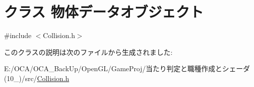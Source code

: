\hypertarget{class_xE7_x89_xA9_xE4_xBD_x93_xE3_x83_x87_xE3_x83_xBC_xE3_x82_xBF_xE3_x82_xAA_xE3_x83_x96_xE3_x8ec2332b82cff889ade5098f64c7880c4}{\section{クラス 物体データオブジェクト}
\label{class_xE7_x89_xA9_xE4_xBD_x93_xE3_x83_x87_xE3_x83_xBC_xE3_x82_xBF_xE3_x82_xAA_xE3_x83_x96_xE3_x8ec2332b82cff889ade5098f64c7880c4}
}


{\ttfamily \#include $<$Collision.\-h$>$}



このクラスの説明は次のファイルから生成されました\-:\begin{DoxyCompactItemize}
\item 
E\-:/\-O\-C\-A/\-O\-C\-A\-\_\-\-Back\-Up/\-Open\-G\-L/\-Game\-Proj/当たり判定と職種作成とシェーダ(10\-\_)/src/\hyperlink{_collision_8h}{Collision.\-h}\end{DoxyCompactItemize}
